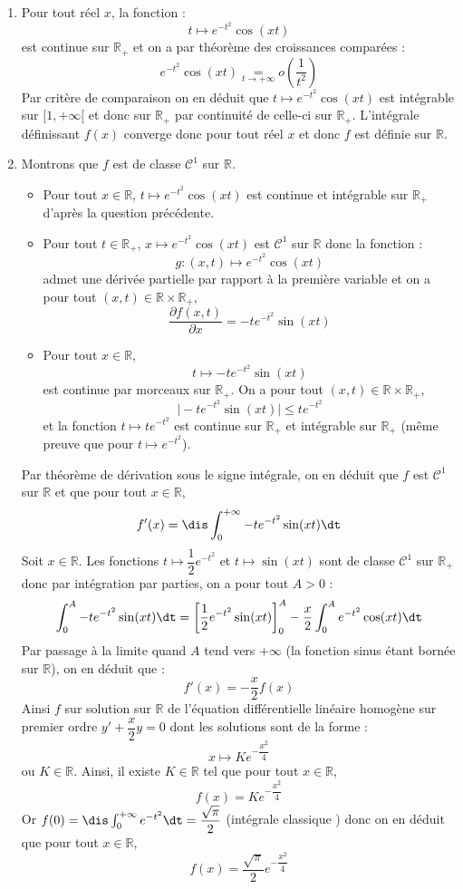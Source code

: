\documentclass[a4paper,10pt]{report}
\begin{document}
\corr \begin{enumerate}
\item Pour tout réel $x$, la fonction :
$$t \mapsto e^{-t^2} \cos(xt)$$
est continue sur $\mathbb{R}_+$ et on a par théorème des croissances comparées :
$$ e^{-t^2} \cos(xt)  \underset{t \rightarrow + \infty}{=} o \left( \dfrac{1}{t^2} \right)$$
Par critère de comparaison on en déduit que $t \mapsto e^{-t^2} \cos(xt)$ est intégrable sur $[1, + \infty[$ et donc sur $\mathbb{R}_+$ par continuité de celle-ci sur $\mathbb{R}_+$. L'intégrale définissant $f(x)$ converge donc pour tout réel $x$ et donc $f$ est définie sur $\mathbb{R}$.

\item Montrons que $f$ est de classe $\mathcal{C}^1$ sur $\mathbb{R}$.
\begin{itemize}
\item Pour tout $x \in \mathbb{R}$, $t \mapsto e^{-t^2} \cos(xt)$ est continue et intégrable sur $\mathbb{R}_+$ d'après la question précédente.
\item Pour tout $t \in \mathbb{R}_+$, $x \mapsto e^{-t^2} \cos(xt)$ est $\mathcal{C}^1$ sur $\mathbb{R}$ donc la fonction :
$$g: (x,t) \mapsto e^{-t^2} \cos(xt)$$
admet une dérivée partielle par rapport à la première variable et on a pour tout $(x,t) \in \mathbb{R} \times \mathbb{R}_+$,
$$ \dfrac{\partial f (x,t)}{\partial x} = -t e^{-t^2} \sin(xt)$$
\item Pour tout $x \in \mathbb{R}$,
$$ t \mapsto -t e^{-t^2} \sin(xt)$$
est continue par morceaux sur $\mathbb{R}_{+}$. On a pour tout $(x,t) \in \mathbb{R} \times \mathbb{R}_+$,
$$ \vert  -t e^{-t^2} \sin(xt) \vert \leq t e^{-t^2} $$
et la fonction $t \mapsto t e^{-t^2}$ est continue sur $\mathbb{R}_+$ et intégrable sur $\mathbb{R}_+$ (même preuve que pour $t \mapsto e^{-t^2}$).
\end{itemize}
Par théorème de dérivation sous le signe intégrale, on en déduit que $f$ est $\mathcal{C}^1$ sur $\mathbb{R}$ et que pour tout $x \in \mathbb{R}$,
$$f'(x) =  \dis \int_{0}^{+ \infty} -t e^{-t^2} \sin(xt) \dt$$
Soit $x \in \mathbb{R}$. Les fonctions $t \mapsto \dfrac{1}{2} e^{-t^2}$ et $t \mapsto \sin(xt)$ sont de classe $\mathcal{C}^1$ sur $\mathbb{R}_+$ donc par intégration par parties, on a pour tout $A>0$ :
$$ \int_{0}^{A}  -t e^{-t^2} \sin(xt) \dt = \left[\dfrac{1}{2} e^{-t^2}  \sin(xt) \right]_0^A - \dfrac{x}{2} \int_{0}^A e^{-t^2} \cos(xt) \dt$$ 
Par passage à la limite quand $A$ tend vers $+ \infty$ (la fonction sinus étant bornée sur $\mathbb{R}$), on en déduit que :
$$ f'(x) = - \dfrac{x}{2} f(x)$$
Ainsi $f$ sur solution sur $\mathbb{R}$ de l'équation différentielle linéaire homogène sur premier ordre $y'+ \dfrac{x}{2}y=0$ dont les solutions sont de la forme :
$$ x \mapsto K e^{- \dfrac{x^2}{4}}$$
ou $K \in \mathbb{R}$. Ainsi, il existe $K \in \mathbb{R}$ tel que pour tout $x \in \mathbb{R}$,
$$ f(x) = Ke^{- \dfrac{x^2}{4}}$$
Or $f(0)= \dis \int_{0}^{+ \infty} e^{-t^2} \dt = \dfrac{\sqrt{\pi}}{2}$ (intégrale \og classique \fg) donc on en déduit que pour tout $x \in \mathbb{R}$,
$$ f(x) = \dfrac{\sqrt{\pi}}{2 } e^{- \dfrac{x^2}{4}}$$
\end{enumerate}
\end{document}
